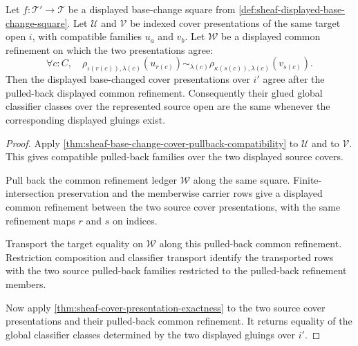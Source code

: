 \begin{theorem}
\label{thm:sheaf-base-change-common-refinement-invariance}
Let $f:\mathcal{T}'\to\mathcal{T}$ be a displayed base-change square from \autoref{def:sheaf-displayed-base-change-square}. Let $\mathcal{U}$ and $\mathcal{V}$ be indexed cover presentations of the same target open $i$, with compatible families $u_a$ and $v_b$. Let $\mathcal{W}$ be a displayed common refinement on which the two presentations agree:
$$
\forall c:C,\quad
\rho_{\iota(r(c)),\lambda(c)}(u_{r(c)})
\sim_{\lambda(c)}
\rho_{\kappa(s(c)),\lambda(c)}(v_{s(c)}).
$$
Then the displayed base-changed cover presentations over $i'$ agree after the pulled-back displayed common refinement. Consequently their glued global classifier classes over the represented source open are the same whenever the corresponding displayed gluings exist.
\end{theorem}
\begin{proof}
Apply \autoref{thm:sheaf-base-change-cover-pullback-compatibility} to $\mathcal{U}$ and to $\mathcal{V}$. This gives compatible pulled-back families over the two displayed source covers.

Pull back the common refinement ledger $\mathcal{W}$ along the same square. Finite-intersection preservation and the memberwise carrier rows give a displayed common refinement between the two source cover presentations, with the same refinement maps $r$ and $s$ on indices.

Transport the target equality on $\mathcal{W}$ along this pulled-back common refinement. Restriction composition and classifier transport identify the transported rows with the two source pulled-back families restricted to the pulled-back refinement members.

Now apply \autoref{thm:sheaf-cover-presentation-exactness} to the two source cover presentations and their pulled-back common refinement. It returns equality of the global classifier classes determined by the two displayed gluings over $i'$.
\end{proof}

